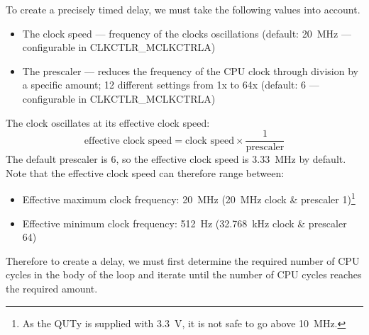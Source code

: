 \documentclass[a4paper]{report}
\begin{document}
To create a precisely timed delay, we must take the following values into account.
\begin{itemize}
    \item The clock speed --- frequency of the clocks oscillations (default: \qty{20}{MHz} --- configurable in CLKCTLR\_MCLKCTRLA)
    \item The prescaler --- reduces the frequency of the CPU clock through division by a specific amount; 12 different settings from 1x to 64x (default: 6 --- configurable in CLKCTLR\_MCLKCTRLA)
\end{itemize}
The clock oscillates at its effective clock speed:
\begin{equation*}
    \text{effective clock speed} = \text{clock speed} \times \frac{1}{\text{prescaler}}
\end{equation*}
The default prescaler is 6, so the effective clock speed is \qty{3.33}{MHz} by default.
Note that the effective clock speed can therefore range between:
\begin{itemize}
    \item Effective maximum clock frequency: \qty{20}{MHz} (\qty{20}{MHz} clock \& prescaler 1)\footnote{As the QUTy is supplied with \qty{3.3}{V}, it is not safe to go above \qty{10}{MHz}.}
    \item Effective minimum clock frequency: \qty{512}{Hz} (\qty{32.768}{kHz} clock \& prescaler 64)
\end{itemize}
Therefore to create a delay, we must first determine the required number of CPU cycles in the body of the loop
and iterate until the number of CPU cycles reaches the required amount.
\end{document}
